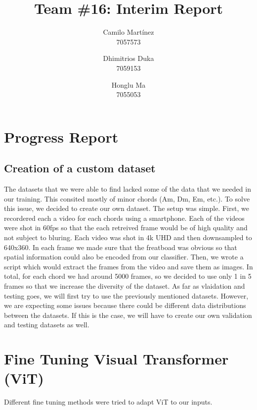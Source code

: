 \documentclass[10pt,twocolumn,letterpaper]{article}
\begin{document}
\title{Team \#16: Interim Report} 

\author{
 Camilo Martínez\\
 7057573\\
    \and
 Dhimitrios Duka\\
 7059153\\
    \and
 Honglu Ma\\
 7055053\\
}
\maketitle

\section{Progress Report}


\subsection{Creation of a custom dataset}
The datasets that we were able to find lacked some of the data that we needed in our training. This consited mostly of minor chords (Am, Dm, Em, etc.). To solve this issue, we decided to create our own dataset. The setup was simple. First, we recordered each a video for each chords using a smartphone. Each of the videos were shot in 60fps so that the each retreived frame would be of high quality and not subject to bluring. Each video was shot in 4k UHD and then downsampled to 640x360. In each frame we made sure that the freatboad was obvious so that spatial information could also be encoded from our classifier. Then, we wrote a script which would extract the frames from the video and save them as images. In total, for each chord we had around 5000 frames, so we decided to use only 1 in 5 frames so that we increase the diversity of the dataset. As far as vlaidation and testing goes,
we will first try to use the previously mentioned datasets. However, we are expecting some issues because there could be different data distributions between the datasets. If this is the case, we will have to create our own validation and testing datasets as well.

\section{Fine Tuning Visual Transformer (ViT)}
Different fine tuning methods were tried to adapt ViT to our inputs.
\end{document}
